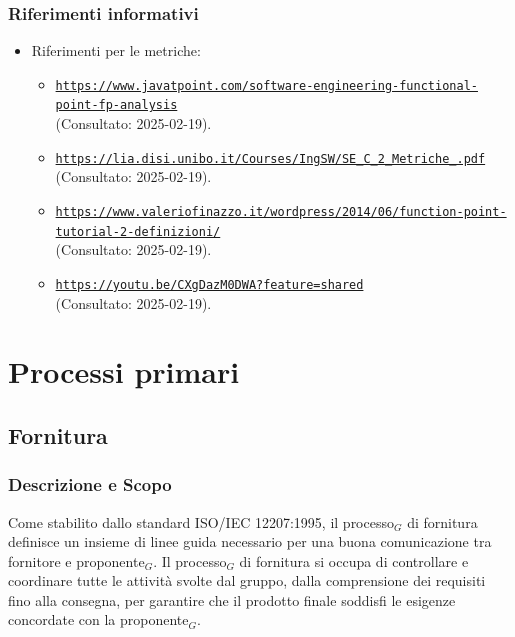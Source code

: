 \documentclass[10pt]{article}
\begin{document}
\begin{justify}
        \subsubsection{Riferimenti informativi}
        \begin{itemize}
            \item Riferimenti per le metriche: 
            \begin{itemize}
                \item \textcolor{blue}{\texttt{\url{https://www.javatpoint.com/software-engineering-functional-point-fp-analysis}}}\\
              (Consultato: 2025-02-19).\\
                \item \textcolor{blue}{\texttt{\url{https://lia.disi.unibo.it/Courses/IngSW/SE_C_2_Metriche_.pdf}}}\\
              (Consultato: 2025-02-19).\\
                \item \textcolor{blue}{\texttt{\url{https://www.valeriofinazzo.it/wordpress/2014/06/function-point-tutorial-2-definizioni/}}}\\
              (Consultato: 2025-02-19).\\
                \item \textcolor{blue}{\texttt{\url{https://youtu.be/CXgDazM0DWA?feature=shared}}}\\
              (Consultato: 2025-02-19).
            \end{itemize}
        \end{itemize}

\newpage
\section{Processi primari}
    \subsection{Fornitura}

    \subsubsection{Descrizione e Scopo}
    Come stabilito dallo standard ISO/IEC 12207:1995, il processo$_G$ di fornitura definisce un insieme di linee guida necessario per una buona comunicazione tra fornitore e proponente$_G$. Il processo$_G$ di fornitura si occupa di controllare e coordinare tutte le attività svolte dal gruppo, dalla comprensione dei requisiti fino alla consegna, per garantire che il prodotto finale soddisfi le esigenze concordate con la proponente$_G$.\\


\end{justify}
\end{document}
